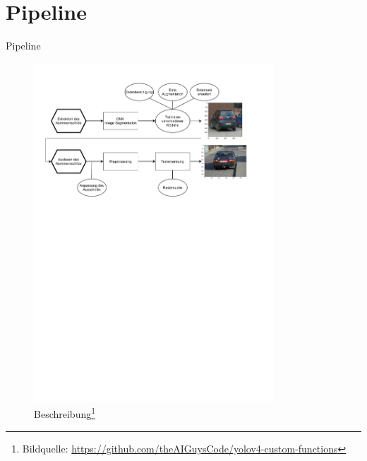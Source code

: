\section{Pipeline}

\begin{frame}{Pipeline}
  \begin{figure}
    \begin{center}
      \includegraphics[width=0.8\textwidth]{img/Pipeline}
      \caption{Beschreibung\footnote{Bildquelle: \url{https://github.com/theAIGuysCode/yolov4-custom-functions}}}
    \end{center}
  \end{figure}
\end{frame}
